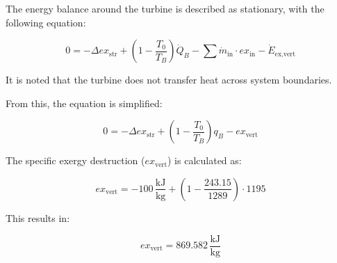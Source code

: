 The energy balance around the turbine is described as stationary, with the following equation:  

\[
0 = -\Delta ex_{\text{str}} + \left( 1 - \frac{T_0}{T_B} \right) \dot{Q}_B - \sum \dot{m}_{\text{in}} \cdot ex_{\text{in}} - \dot{E}_{\text{ex,vert}}
\]

It is noted that the turbine does not transfer heat across system boundaries.  

From this, the equation is simplified:  

\[
0 = -\Delta ex_{\text{str}} + \left( 1 - \frac{T_0}{T_B} \right) q_B - ex_{\text{vert}}
\]

The specific exergy destruction (\( ex_{\text{vert}} \)) is calculated as:  

\[
ex_{\text{vert}} = -100 \, \frac{\text{kJ}}{\text{kg}} + \left( 1 - \frac{243.15}{1289} \right) \cdot 1195
\]

This results in:  

\[
ex_{\text{vert}} = 869.582 \, \frac{\text{kJ}}{\text{kg}}
\]